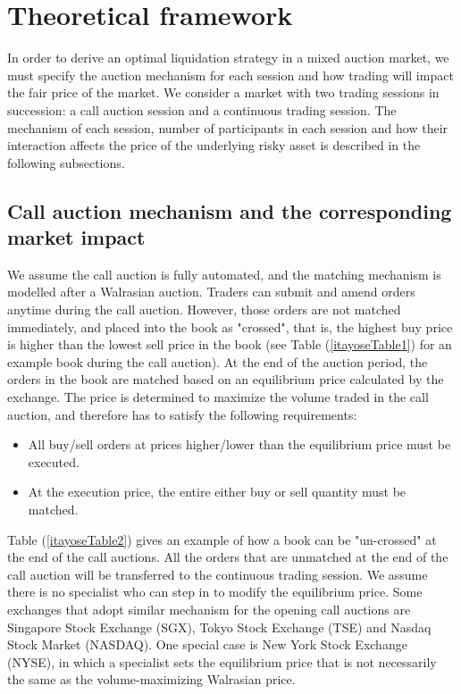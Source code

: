 \documentclass{article}
\begin{document}
\section{Theoretical framework}\label{secTheoreticalFramework}
In order to derive an optimal liquidation strategy in a mixed auction market, we must specify the auction mechanism for each session and how trading will impact the fair price of the market. We consider a market with two trading sessions in succession: a call auction session and a continuous trading session. The mechanism of each session, number of participants in each session and how their interaction affects the price of the underlying risky asset is described in the following subsections.
\subsection{Call auction mechanism and the corresponding market impact}
We assume the call auction is fully automated, and the matching mechanism is modelled after a Walrasian auction. Traders can submit and amend orders anytime during the call auction. However, those orders are not matched immediately, and placed into the book as "crossed", that is, the highest buy price is higher than the lowest sell price in the book (see Table (\ref{itayoseTable1}) for an example book during the call auction). At the end of the auction period, the orders in the book are matched based on an equilibrium price calculated by the exchange. The price is determined to maximize the volume traded in the call auction, and therefore has to satisfy the following requirements:
\begin{itemize}
  \item All buy/sell orders at prices higher/lower than the equilibrium price must be executed.
  \item At the execution price, the entire either buy or sell quantity must be matched.
\end{itemize}
Table (\ref{itayoseTable2}) gives an example of how a book can be "un-crossed" at the end of the call auctions. All the orders that are unmatched at the end of the call auction will be transferred to the continuous trading session. We assume there is no specialist who can step in to modify the equilibrium price. Some exchanges that adopt similar mechanism for the opening call auctions are Singapore Stock Exchange (SGX), Tokyo Stock Exchange (TSE) and Nasdaq Stock Market (NASDAQ). One special case is New York Stock Exchange (NYSE), in which a specialist sets the equilibrium price that is not necessarily the same as the volume-maximizing Walrasian price.
\end{document}
